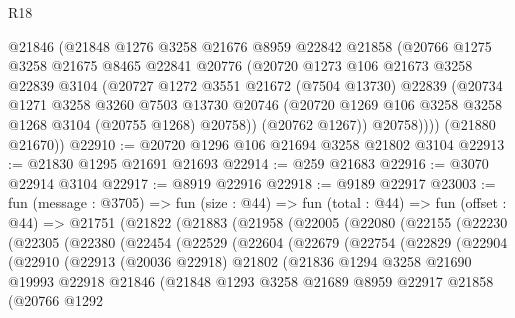 \begin{lexlean}{R18}
\begin{coremodule}
        @21846
        (@21848
          @1276
          @3258
          @21676
          @8959
          @22842
          @21858
          (@20766
            @1275
            @3258
            @21675
            @8465
            @22841
            @20776
            (@20720
              @1273
              @106
              @21673
              @3258
              @22839
              @3104
              (@20727
                @1272
                @3551
                @21672
                (@7504 @13730)
                @22839
                (@20734
                  @1271
                  @3258
                  @3260
                  @7503
                  @13730
                  @20746
                  (@20720 @1269 @106 @3258 @3258 @1268 @3104 (@20755 @1268) @20758))
                (@20762 @1267))
              @20758))))
      (@21880 @21670))
@22910 := @20720 @1296 @106 @21694 @3258 @21802 @3104
@22913 := @21830 @1295 @21691 @21693
@22914 := @259 @21683
@22916 := @3070 @22914 @3104
@22917 := @8919 @22916
@22918 := @9189 @22917
@23003 := fun (message : @3705) =>
  fun (size : @44) =>
  fun (total : @44) =>
  fun (offset : @44) =>
  @21751
    (@21822
      (@21883
        (@21958
          (@22005
            (@22080
              (@22155
                (@22230
                  (@22305
                    (@22380
                      (@22454
                        (@22529
                          (@22604
                            (@22679
                              (@22754
                                (@22829
                                  (@22904
                                    (@22910
                                      (@22913
                                        (@20036 @22918)
                                        @21802
                                        (@21836
                                          @1294
                                          @3258
                                          @21690
                                          @19993
                                          @22918
                                          @21846
                                          (@21848
                                            @1293
                                            @3258
                                            @21689
                                            @8959
                                            @22917
                                            @21858
                                            (@20766
                                              @1292

\end{coremodule}
\end{lexlean}
